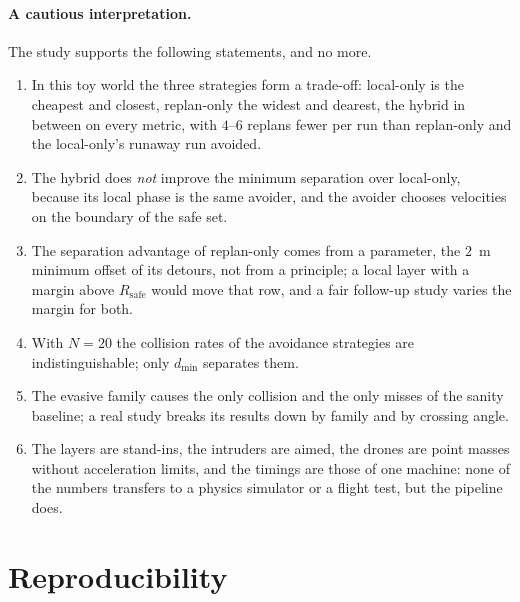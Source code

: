 \paragraph{A cautious interpretation.}
The study supports the following statements, and no more.
\begin{enumerate}
  \item In this toy world the three strategies form a trade-off: local-only
        is the cheapest and closest, replan-only the widest and dearest, the
        hybrid in between on every metric, with $4$--$6$ replans fewer per
        run than replan-only and the local-only's runaway run avoided.
  \item The hybrid does \emph{not} improve the minimum separation over
        local-only, because its local phase is the same avoider, and the
        avoider chooses velocities on the boundary of the safe set.
  \item The separation advantage of replan-only comes from a parameter,
        the $2$~m minimum offset of its detours, not from a principle; a
        local layer with a margin above $R_{\mathrm{safe}}$ would move that
        row, and a fair follow-up study varies the margin for both.
  \item With $N = 20$ the collision rates of the avoidance strategies are
        indistinguishable; only $d_{\min}$ separates them.
  \item The evasive family causes the only collision and the only misses of
        the sanity baseline; a real study breaks its results down by family
        and by crossing angle.
  \item The layers are stand-ins, the intruders are aimed, the drones are
        point masses without acceleration limits, and the timings are those
        of one machine: none of the numbers transfers to a physics simulator
        or a flight test, but the pipeline does.
\end{enumerate}

\section{Reproducibility}
\label{sec:ch25-reproducibility}

